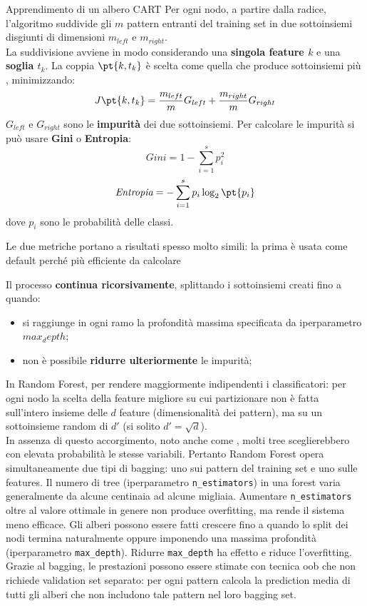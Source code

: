 \begin{example}{Apprendimento di un albero CART}{}
    Per ogni nodo, a partire dalla radice, l'algoritmo suddivide gli $m$ pattern entranti del training set in due sottoinsiemi disgiunti di dimensioni $m_{left}$ e $m_{right}$.
    \\
    La suddivisione avviene in modo  considerando una \textbf{singola feature $k$} e una \textbf{soglia $t_k$}.
    La coppia $\pt{k,t_k}$ è scelta come quella che produce sottoinsiemi più , minimizzando:
    \[
        J\pt{k,t_k} = \frac{m_{left}}{m}G_{left} + \frac{m_{right}}{m}G_{right}
    \]
    $G_{left}$ e $G_{right}$ sono le \textbf{impurità} dei due sottoinsiemi.
    Per calcolare le impurità si può usare \textbf{Gini} o \textbf{Entropia}:
    \[
        \textit{Gini} = 1 - \sum_{i=1}^s{p_i^2}
    \]
    \[
        \textit{Entropia} = - \sum_{i=1}^s{p_i\log_2\pt{p_i}}
    \]
    dove $p_i$ sono le probabilità delle classi.
    \begin{note}
        Le due metriche portano a risultati spesso molto simili: la prima è usata come default perché più efficiente da calcolare
    \end{note}
    Il processo \textbf{continua ricorsivamente}, splittando i sottoinsiemi creati fino a quando:
    \begin{itemize}
        \item si raggiunge in ogni ramo la profondità massima specificata da iperparametro $max_depth$;
        \item non è possibile \textbf{ridurre ulteriormente} le impurità;
    \end{itemize}
\end{example}
In Random Forest, per rendere maggiormente indipendenti i classificatori: per ogni nodo la scelta della feature migliore su cui partizionare non è fatta sull'intero insieme delle $d$ feature (dimensionalità dei pattern), ma su un sottoinsieme random di $d'$ (si solito $d' = \sqrt d$).
\\
In assenza di questo accorgimento, noto anche come , molti tree sceglierebbero con elevata probabilità le stesse variabili.
Pertanto Random Forest opera simultaneamente due tipi di bagging: uno sui pattern del training set e uno sulle features.
\emptyln{}
Il numero di tree (iperparametro \texttt{n\_estimators}) in una forest varia generalmente da alcune centinaia ad alcune migliaia.
Aumentare \texttt{n\_estimators} oltre al valore ottimale in genere non produce overfitting, ma rende il sistema meno efficace.
\emptyln{}
Gli alberi possono essere fatti crescere fino a quando lo split dei nodi termina naturalmente oppure imponendo una massima profondità (iperparametro \texttt{max\_depth}).
Ridurre \texttt{max\_depth} ha effetto  e riduce l'overfitting.
\emptyln{}
Grazie al bagging, le prestazioni possono essere stimate con tecnica \ac{oob} che non richiede validation set separato: per ogni pattern calcola la prediction media di tutti gli alberi che non includono tale pattern nel loro bagging set.
%
